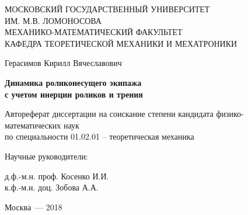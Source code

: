 \thispagestyle{empty}%
\begin{center}%
\MakeUppercase{Московский государственный университет}\\
\MakeUppercase{им. М.В. Ломоносова}\\
\MakeUppercase{механико-математический факультет}\\
\MakeUppercase{кафедра теоретической механики и мехатроники}
\end{center}%
%
\vspace{0pt plus4fill} %
\begin{flushright}%


\end{flushright}%
%
\vspace{0pt plus6fill} %
\begin{center}%
{\large Герасимов Кирилл Вячеславович}
\end{center}%
%
\vspace{0pt plus1fill} %
\begin{center}%
\textbf {\large Динамика роликонесущего экипажа \\ с учетом инерции роликов и трения}


\vspace{0pt plus2fill} %
Автореферат диссертации на соискание степени кандидата физико-математических наук\\
по специальности 01.02.01 -- теоретическая механика

\end{center}%
%
\vspace{0pt plus4fill} %
\begin{flushright}%
Научные руководители:

д.ф.-м.н. проф. Косенко И.И.\\
к.ф.-м.н. доц. Зобова А.А.

\end{flushright}%
%
\vspace{0pt plus4fill} %
\begin{center}%
{Москва~--- 2018}
\end{center}%
\newpage
